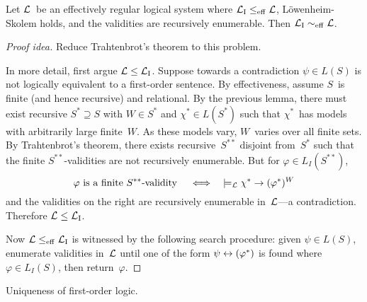 \begin{thm}
Let \(\mathcal{L}\)~be an effectively regular logical system where \(\mathcal{L}_{\mathrm{I}}\le_{\mathrm{eff}}\mathcal{L}\), L\"owenheim-Skolem holds, and the validities are recursively enumerable. Then \(\mathcal{L}_{\mathrm{I}}\sim_{\mathrm{eff}}\mathcal{L}\).
\end{thm}
\begin{proof}[Proof idea]
Reduce Trahtenbrot's theorem to this problem.

In more detail, first argue \(\mathcal{L}\le\mathcal{L}_{\mathrm{I}}\). Suppose towards a contradiction \(\psi\in L(S)\) is not logically equivalent to a first-order sentence. By effectiveness, assume \(S\)~is finite (and hence recursive) and relational. By the previous lemma, there must exist recursive \(S^*\supseteq S\) with \(W\in S^*\) and \(\chi^*\in L(S^*)\) such that \(\chi^*\)~has models with arbitrarily large finite~\(W\). As these models vary, \(W\)~varies over all finite sets. By Trahtenbrot's theorem, there exists recursive~\(S^{**}\) disjoint from~\(S^*\) such that the finite \(S^{**}\)-validities are not recursively enumerable. But for \(\varphi\in L_I(S^{**})\),
\[\varphi\text{ is a finite }S^{**}\text{-validity}\quad\iff\quad\models_{\mathcal{L}}\chi^*\rightarrow(\varphi^*)^W\]
and the validities on the right are recursively enumerable in~\(\mathcal{L}\)---a contradiction. Therefore \(\mathcal{L}\le\mathcal{L}_{\mathrm{I}}\).

Now \(\mathcal{L}\le_{\mathrm{eff}}\mathcal{L}_{\mathrm{I}}\) is witnessed by the following search procedure: given \(\psi\in L(S)\), enumerate validities in~\(\mathcal{L}\) until one of the form \(\psi\leftrightarrow(\varphi^*)\) is found where \(\varphi\in L_I(S)\), then return~\(\varphi\).
\end{proof}

\begin{app}
Uniqueness of first-order logic.
\end{app}
